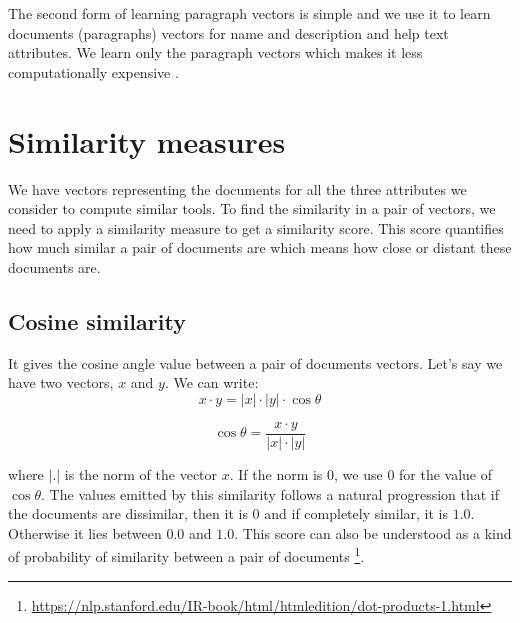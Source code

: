 The second form of learning paragraph vectors is simple and we use it to learn documents (paragraphs) vectors for name and description and help text attributes. We learn only the paragraph vectors which makes it less computationally expensive \cite{DBLP:journals/corr/LeM14}.

\section{Similarity measures}
We have vectors representing the documents for all the three attributes we consider to compute similar tools. To find the similarity in a pair of vectors, we need to apply a similarity measure to get a similarity score. This score quantifies how much similar a pair of documents are which means how close or distant these documents are.

\subsection{Cosine similarity}
It gives the cosine angle value between a pair of documents vectors. Let's say we have two vectors, $x$ and $y$. We can write:
\begin{equation}
x \cdot y = |x| \cdot |y| \cdot \cos{\theta}
\end{equation}

\begin{equation}
\cos{\theta} = \frac {x \cdot y}{|x| \cdot |y|} 
\end{equation}

where $|.|$ is the norm of the vector $x$. If the norm is $0$, we use $0$ for the value of $\cos{\theta}$. The values emitted by this similarity follows a natural progression that if the documents are dissimilar, then it is $0$ and if completely similar, it is $1.0$. Otherwise it lies between $0.0$ and $1.0$. This score can also be understood as a kind of probability of similarity between a pair of documents \footnote{\url{https://nlp.stanford.edu/IR-book/html/htmledition/dot-products-1.html}}. 


